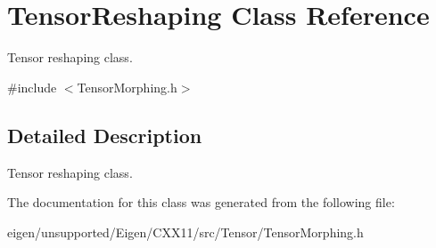 \hypertarget{class_tensor_reshaping}{}\section{Tensor\+Reshaping Class Reference}
\label{class_tensor_reshaping}


Tensor reshaping class.  




{\ttfamily \#include $<$Tensor\+Morphing.\+h$>$}



\subsection{Detailed Description}
Tensor reshaping class. 

The documentation for this class was generated from the following file\+:\begin{DoxyCompactItemize}
\item 
eigen/unsupported/\+Eigen/\+C\+X\+X11/src/\+Tensor/\+Tensor\+Morphing.\+h\end{DoxyCompactItemize}
